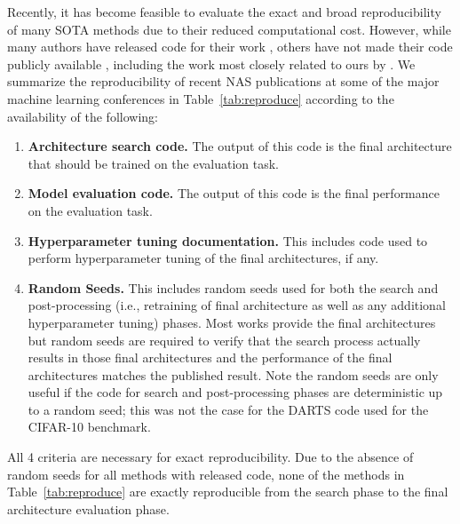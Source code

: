 \documentclass[acmlarge, nonacm]{acmart}
\begin{document}
Recently, it has become feasible to evaluate the exact and broad reproducibility of many SOTA methods due to their reduced computational cost.  However, while many authors have released code for their work \citep[e.g.,][]{pham18ENAS, liu2018darts, brock2018smash, cai2018path}, others have not made their code publicly available \citep[e.g.,][]{xie2018snas, zhang2018graph}, including the work most closely related to ours by \citet{bender2018understanding}.  We summarize the reproducibility of recent NAS publications at some of the major machine learning conferences in Table~\ref{tab:reproduce} according to the availability of the following:
\begin{enumerate}
    \item \textbf{Architecture search code.}  The output of this code is the final architecture that should be trained on the evaluation task.  
    \item \textbf{Model evaluation code.} The output of this code is the final performance on the evaluation task.  
    \item \textbf{Hyperparameter tuning documentation.}  This includes code used to perform hyperparameter tuning of the final architectures, if any.  
    \item \textbf{Random Seeds.} This includes random seeds used for both the search and post-processing (i.e., retraining of final architecture as well as any additional hyperparameter tuning) phases.  Most works provide the final architectures but random seeds are required to verify that the search process actually results in those final architectures and the performance of the final architectures matches the published result.  Note the random seeds are only useful if the code for search and post-processing phases are deterministic up to a random seed; this was not the case for the DARTS code used for the CIFAR-10 benchmark.
\end{enumerate}

All 4 criteria are necessary for exact reproducibility.  Due to the absence of random seeds for all methods with released code, none of the methods in Table~\ref{tab:reproduce} are exactly reproducible from the search phase to the final architecture evaluation phase.  
\end{document}
